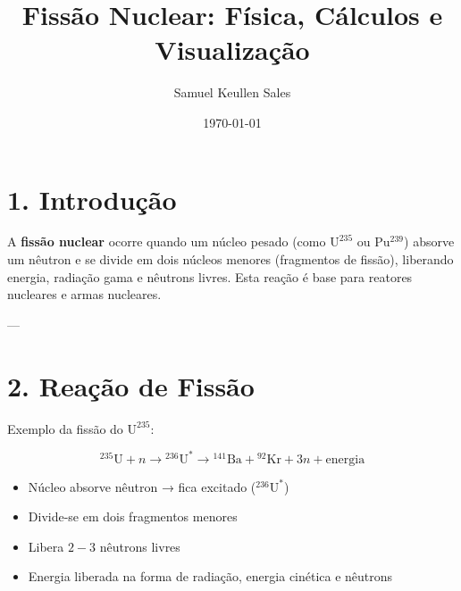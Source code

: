 \documentclass[12pt,a4paper]{article}
\title{Fissão Nuclear: Física, Cálculos e Visualização}
\author{Samuel Keullen Sales}
\date{\today}
\begin{document}
\maketitle

\section*{1. Introdução}

A \textbf{fissão nuclear} ocorre quando um núcleo pesado (como \(\mathrm{U^{235}}\) ou \(\mathrm{Pu^{239}}\)) absorve um nêutron e se divide em dois núcleos menores (fragmentos de fissão), liberando energia, radiação gama e nêutrons livres.  
Esta reação é base para reatores nucleares e armas nucleares.

---

\section*{2. Reação de Fissão}

Exemplo da fissão do \(\mathrm{U^{235}}\):

\[
{}^{235}\mathrm{U} + n \rightarrow {}^{236}\mathrm{U}^* \rightarrow {}^{141}\mathrm{Ba} + {}^{92}\mathrm{Kr} + 3 n + \text{energia}
\]

\begin{itemize}
    \item Núcleo absorve nêutron → fica excitado (\({}^{236}\mathrm{U}^*\))
    \item Divide-se em dois fragmentos menores
    \item Libera \(2-3\) nêutrons livres
    \item Energia liberada na forma de radiação, energia cinética e nêutrons
\end{itemize}

\begin{center}
\end{center}
\end{document}

